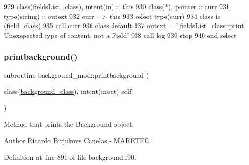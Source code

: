 \begin{DoxyCode}
929     \textcolor{keywordtype}{class}(fieldsList\_class), \textcolor{keywordtype}{intent(in)} :: this
930     \textcolor{keywordtype}{class}(*), \textcolor{keywordtype}{pointer} :: curr
931     \textcolor{keywordtype}{type}(string) :: outext
932     curr => this%
933     \textcolor{keywordflow}{select type}(curr)
934 \textcolor{keywordflow}{    class is} (field\_class)
935         \textcolor{keyword}{call }curr%
936 \textcolor{keywordflow}{        class default}
937         outext = \textcolor{stringliteral}{'[fieldsList\_class::print] Unexepected type of content, not a Field'}
938         \textcolor{keyword}{call }log%
939         stop
940 \textcolor{keywordflow}{    end select}
\end{DoxyCode}
\mbox{\label{namespacebackground__mod_a8a8f225cffcddb742f22a402155b703f}} 
\subsubsection{\texorpdfstring{printbackground()}{printbackground()}}
{\footnotesize\ttfamily subroutine background\+\_\+mod\+::printbackground (\begin{DoxyParamCaption}\item[{class(\mbox{\hyperlink{structbackground__mod_1_1background__class}{background\+\_\+class}}), intent(inout)}]{self }\end{DoxyParamCaption})\hspace{0.3cm}{\ttfamily [private]}}



Method that prints the Background object. 

\begin{DoxyAuthor}{Author}
Ricardo Birjukovs Canelas -\/ M\+A\+R\+E\+T\+EC 
\end{DoxyAuthor}


Definition at line 891 of file background.\+f90.


